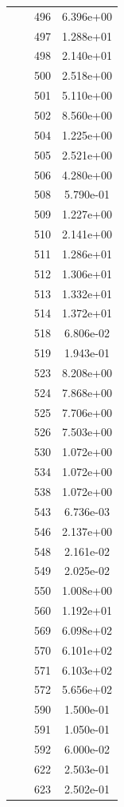 \documentclass[12pt]{article}
\begin{document}
\begin{longtable}{@{}cccc@{}}
 &  & 496 & 6.396e+00 \\
 &  & 497 & 1.288e+01 \\
 &  & 498 & 2.140e+01 \\
 &  & 500 & 2.518e+00 \\
 &  & 501 & 5.110e+00 \\
 &  & 502 & 8.560e+00 \\
 &  & 504 & 1.225e+00 \\
 &  & 505 & 2.521e+00 \\
 &  & 506 & 4.280e+00 \\
 &  & 508 & 5.790e-01 \\
 &  & 509 & 1.227e+00 \\
 &  & 510 & 2.141e+00 \\
 &  & 511 & 1.286e+01 \\
 &  & 512 & 1.306e+01 \\
 &  & 513 & 1.332e+01 \\
 &  & 514 & 1.372e+01 \\
 &  & 518 & 6.806e-02 \\
 &  & 519 & 1.943e-01 \\
 &  & 523 & 8.208e+00 \\
 &  & 524 & 7.868e+00 \\
 &  & 525 & 7.706e+00 \\
 &  & 526 & 7.503e+00 \\
 &  & 530 & 1.072e+00 \\
 &  & 534 & 1.072e+00 \\
 &  & 538 & 1.072e+00 \\
 &  & 543 & 6.736e-03 \\
 &  & 546 & 2.137e+00 \\
 &  & 548 & 2.161e-02 \\
 &  & 549 & 2.025e-02 \\
 &  & 550 & 1.008e+00 \\
 &  & 560 & 1.192e+01 \\
 &  & 569 & 6.098e+02 \\
 &  & 570 & 6.101e+02 \\
 &  & 571 & 6.103e+02 \\
 &  & 572 & 5.656e+02 \\
 &  & 590 & 1.500e-01 \\
 &  & 591 & 1.050e-01 \\
 &  & 592 & 6.000e-02 \\
 &  & 622 & 2.503e-01 \\
 &  & 623 & 2.502e-01 \\

\end{longtable}
\end{document}
